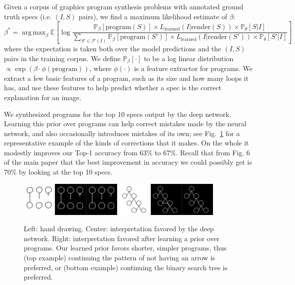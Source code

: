 \documentclass{article}
\DeclareMathOperator*{\argmax}{arg\,max} %
\newcommand{\expect}{\mathds{E}} %
\newcommand{\probability}{\mathds{P}} %
\begin{document}
Given a corpus of graphics program synthesis problems with annotated ground truth specs (i.e. $(I,S)$ pairs),
we find a maximum likelihood estimate of $\beta$:
\begin{equation}
  \beta^* = \argmax_{\beta} \expect \left[ \log \frac{\probability_{\beta} [\text{program}(S)]\times L_{\text{learned}}(I|\text{render}(S))\times \probability_\theta[S|I]}{\sum_{S'\in \mathcal{F}(I)} \probability_{\beta} [\text{program}(S')]\times L_{\text{learned}}(I|\text{render}(S'))\times \probability_\theta[S'|I]} \right]
\end{equation}
where the expectation is taken both over the model predictions and the
$(I,S)$ pairs in the training corpus.  We define $\probability_{\beta}
[\cdot]$ to be a log linear distribution $\propto \exp
(\beta\cdot \phi(\text{program}))$, where $\phi(\cdot)$ is a feature
extractor for programs.  We extract a few basic features of a
program, such as its size and how many loops it has, and use these
features to help predict whether a spec is the correct explanation
for an image.

We synthesized programs for the top 10 specs
output by the deep network.  Learning this prior over programs can
help correct mistakes made by the neural network, and also
occasionally introduces mistakes of its own; see
Fig.~\ref{exampleOfProgramCorrectingMistake} for a representative
example of the kinds of corrections that it makes. On the whole
it modestly improves our Top-1 accuracy from 63\% to 67\%.  Recall that
from Fig. 6 of the main paper that the best improvement
in accuracy we could possibly get is 70\% by looking at the top 10 specs. 
\begin{figure}[h]\centering
  \begin{minipage}{6cm}
      \includegraphics[width = 5cm]{figures/programSuccess7.png}
  \includegraphics[width = 5cm]{figures/programSuccess16.png}
    \end{minipage}
  \caption{Left: hand drawing. Center: interpretation favored by the deep network. Right: interpretation favored after learning a prior over programs. Our learned prior favors shorter, simpler programs, thus (top example) continuing the pattern of not having an arrow is preferred, or (bottom example) continuing the binary search tree is preferred.}\label{exampleOfProgramCorrectingMistake}
\end{figure}
\end{document}
